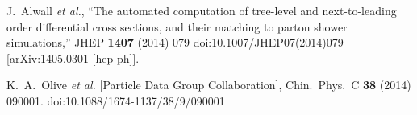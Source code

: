 \documentclass[11pt]{article}
\begin{document}
\begin{thebibliography}{9}

  J.~Alwall {\it et al.},
  ``The automated computation of tree-level and next-to-leading order differential cross sections, and their matching to parton shower simulations,''
  JHEP {\bf 1407} (2014) 079
  doi:10.1007/JHEP07(2014)079
  [arXiv:1405.0301 [hep-ph]].
  
  K.~A.~Olive {\it et al.} [Particle Data Group Collaboration],
  Chin.\ Phys.\ C {\bf 38} (2014) 090001.
  doi:10.1088/1674-1137/38/9/090001
  
\end{thebibliography}


\end{document}
